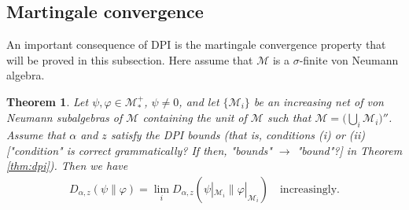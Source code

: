\documentclass[12pt]{article}
\newtheorem{theorem}{Theorem}[section]
\theoremstyle{definition}
\theoremstyle{remark}
\numberwithin{equation}{section}
\def\cM{\mathcal M}
\def\Me{\mathcal M}
\def\ffi{\varphi}
\begin{document}
\subsection{Martingale convergence}

An important consequence of DPI is the martingale convergence property that will be
proved in this {\color{red}subsection. Here assume that $\cM$ is a $\sigma$-finite von Neumann algebra.}

\begin{theorem}\label{thm:martingale}
Let $\psi,\varphi\in \Me_*^+$, $\psi\ne 0$, and let $\{\cM_i\}$ be an increasing net of von Neumann
subalgebras of $\cM$ containing the unit of $\cM$ such that $\cM=\bigl(\bigcup_i\cM_i\bigr)''$.
Assume that $\alpha$ and $z$ satisfy the DPI bounds (that is, conditions (i) or (ii)
{\color{red}["condition" is correct grammatically? If then, "bounds" $\to$ "bound"?]}
in Theorem \ref{thm:dpi}). Then we have
\begin{align}\label{eq:martingale}
D_{\alpha,z}(\psi\|\ffi)=\lim_iD_{\alpha,z}(\psi|_{\cM_i}\|\ffi|_{\cM_i})
\quad\mbox{increasingly}.
\end{align}
\end{theorem}
\end{document}
